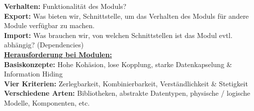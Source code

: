 \documentclass[a4paper]{article}
\begin{document}
	\textbf{Verhalten:} Funktionalität des Moduls?\\
	\textbf{Export:} Was bieten wir, Schnittstelle, um das Verhalten des Moduls für andere Module verfügbar zu machen.\\
	\textbf{Import:} Was brauchen wir, von welchen Schnittstellen ist das Modul evtl. abhängig? (Dependencies)\\
	\newline
	\textbf{\underline{Herausforderung bei Modulen:}} \\
	\textbf{Basiskonzepte:} Hohe Kohäsion, lose Kopplung, starke Datenkapselung \& Information Hiding\\
	\textbf{Vier Kriterien:} Zerlegbarkeit, Kombinierbarkeit, Verständlichkeit \& Stetigkeit\\
	\textbf{Verschiedene Arten:} Bibliotheken, abstrakte Datentypen, physische / logische Modelle, Komponenten, etc.
	
	\newpage
\end{document}
